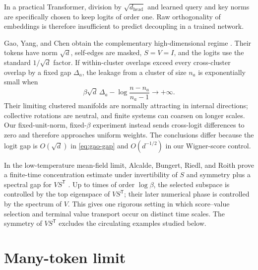 \documentclass[11pt,a4paper]{article}
\theoremstyle{definition}
\newcommand{\T}{\mathsf T}
\begin{document}
In a practical Transformer, division by $\sqrt{d_{\mathrm{head}}}$ and learned query
and key norms are specifically chosen to keep logits of order one. Raw orthogonality of
embeddings is therefore insufficient to predict decoupling in a trained network.

Gao, Yang, and Chen obtain the complementary high-dimensional regime
\cite{gao2026clustered}.  Their tokens have norm $\sqrt d$, self-edges are masked,
$S=V=I$, and the logits use the standard $1/\sqrt d$ factor.  If within-cluster
overlaps exceed every cross-cluster overlap by a fixed gap $\Delta_a$, the leakage
from a cluster of size $n_a$ is exponentially small when
\begin{equation}
 \beta\sqrt d\,\Delta_a-\log\frac{n-n_a}{n_a-1}\longrightarrow+\infty.
 \label{eq:gao-gap}
\end{equation}
Their limiting clustered manifolds are normally attracting in internal directions;
collective rotations are neutral, and finite systems can coarsen on longer scales.
Our fixed-unit-norm, fixed-$\beta$ experiment instead sends cross-logit differences to
zero and therefore approaches uniform weights.  The conclusions differ because the
logit gap is $O(\sqrt d)$ in \eqref{eq:gao-gap} and $O(d^{-1/2})$ in our Wigner-score
control.

In the low-temperature mean-field limit, Alcalde, Bungert, Riedl, and Roith prove a
finite-time concentration estimate under invertibility of $S$ and symmetry plus a
spectral gap for $VS^{\T}$ \cite{alcalde2026concentration}.  Up to times of order
$\log\beta$, the selected subspace is controlled by the top eigenspace of
$VS^{\T}$; their later numerical phase is controlled by the spectrum of $V$.  This
gives one rigorous setting in which score--value selection and terminal value
transport occur on distinct time scales.  The symmetry of $VS^{\T}$ excludes the
circulating examples studied below.

\section{Many-token limit}
\label{sec:meanfield}
\end{document}
